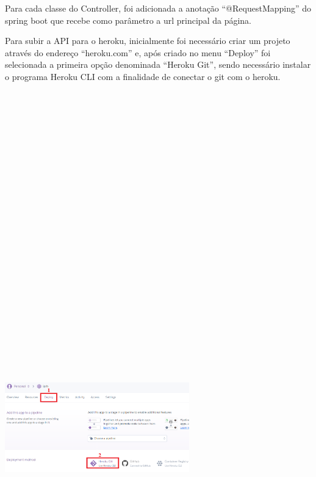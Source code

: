 \documentclass[conference]{IEEEtran}
\begin{document}
Para cada classe do Controller, foi adicionada a anotação “@RequestMapping” do spring boot que recebe como parâmetro a url principal da página.

Para subir a API para o heroku, inicialmente foi necessário criar um projeto através do endereço “heroku.com” e, após criado no menu “Deploy” foi selecionada a primeira opção denominada “Heroku Git”, sendo necessário instalar o programa Heroku CLI com a finalidade de conectar o git com o heroku.

\vspace{7mm}
\centerline{\includegraphics[width=80mm,height=600mm,keepaspectratio]{Heroku.png}}
\vspace{7mm}
\end{document}
